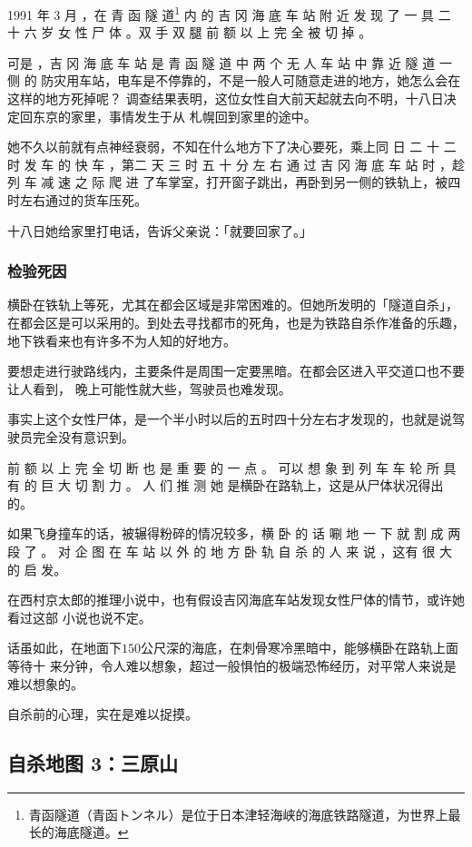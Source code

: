 \documentclass[UTF8]{ctexart}
\begin{document}
1991 年 3 月 ，在 青 函 隧 道\footnote{青函隧道（青函トンネル）是位于日本津轻海峡的海底铁路隧道，为世界上最长的海底隧道。} 内 的 吉 冈 海 底 车 站 附 近 发 现 了 一 具 二 十 六 岁 女 性 尸 体 。双 手 双 腿 前 额 以 上 完 全 被 切 掉 。

可是 ，吉 冈 海 底 车 站 是 青 函 隧 道 中 两 个 无 人 车 站 中 靠 近 隧 道 一 侧 的 防灾用车站，电车是不停靠的，不是一般人可随意走进的地方，她怎么会在这样的地方死掉呢？ 调查结果表明，这位女性自大前天起就去向不明，十八日决定回东京的家里，事情发生于从 札幌回到家里的途中。

她不久以前就有点神经衰弱，不知在什么地方下了决心要死，乘上同 日 二 十 二 时 发 车 的 快 车 ，第二 天 三 时 五 十 分 左 右 通 过 吉 冈 海 底 车 站 时 ，趁 列 车 减 速 之 际 爬 进 了车掌室，打开窗子跳出，再卧到另一侧的铁轨上，被四时左右通过的货车压死。 

十八日她给家里打电话，告诉父亲说：「就要回家了。」

\subsubsection*{检验死因}

横卧在铁轨上等死，尤其在都会区域是非常困难的。但她所发明的「隧道自杀」，在都会区是可以采用的。到处去寻找都市的死角，也是为铁路自杀作准备的乐趣，地下铁看来也有许多不为人知的好地方。

要想走进行驶路线内，主要条件是周围一定要黑暗。在都会区进入平交道口也不要让人看到， 晚上可能性就大些，驾驶员也难发现。

事实上这个女性尸体，是一个半小时以后的五时四十分左右才发现的，也就是说驾驶员完全没有意识到。 

前 额 以 上 完 全 切 断 也 是 重 要 的 一 点 。
可以 想 象 到 列 车 车 轮 所 具 有 的 巨 大 切 割 力 。
人 们 推 测 她 是横卧在路轨上，这是从尸体状况得出的。

如果飞身撞车的话，被辗得粉碎的情况较多，横 卧 的 话 唰 地 一 下 就 割 成 两 段 了 。
对 企 图 在 车 站 以 外 的 地 方 卧 轨 自 杀 的 人 来 说 ，这有 很 大 的 启 发。

在西村京太郎的推理小说中，也有假设吉冈海底车站发现女性尸体的情节，或许她看过这部
小说也说不定。

话虽如此，在地面下$150$公尺深的海底，在刺骨寒冷黑暗中，能够横卧在路轨上面等待十
来分钟，令人难以想象，超过一般惧怕的极端恐怖经历，对平常人来说是难以想象的。

自杀前的心理，实在是难以捉摸。


\subsection{自杀地图 3：三原山}
\end{document}
